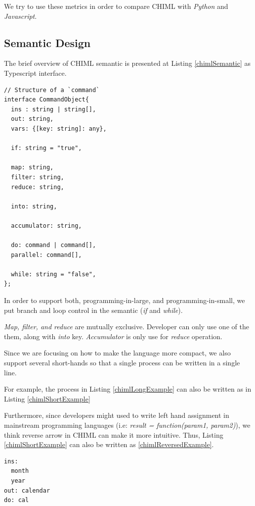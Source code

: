 \documentclass[conference]{IEEEtran}
\begin{document}
We try to use these metrics in order to compare CHIML with {\it Python} and {\it Javascript}.

\subsection{Semantic Design}

The brief overview of CHIML semantic is presented at Listing \ref{chimlSemantic} as Typescript interface.

\begin{lstlisting}[caption=CHIML Semantic Design, label=chimlSemantic, basicstyle=\footnotesize, breaklines=true]
// Structure of a `command`
interface CommandObject{
  ins : string | string[],
  out: string,
  vars: {[key: string]: any},

  if: string = "true",

  map: string,
  filter: string,
  reduce: string,

  into: string,

  accumulator: string,

  do: command | command[],
  parallel: command[],

  while: string = "false",
};
\end{lstlisting}

In order to support both, programming-in-large, and programming-in-small, we put branch and loop control in the semantic ({\it if} and {\it while}). 

{\it Map, filter, and reduce} are mutually exclusive. Developer can only use one of the them, along with {\it into} key. {\it Accumulator} is only use for {\it reduce} operation.

Since we are focusing on how to make the language more compact, we also support several short-hands so that a single process can be written in a single line.

For example, the process in Listing \ref{chimlLongExample} can also be written as in Listing \ref{chimlShortExample}

Furthermore, since developers might used to write left hand assignment in mainstream programming languages (i.e: {\it result = function(param1, param2)}), we think reverse arrow in CHIML can make it more intuitive. Thus, Listing \ref{chimlShortExample} can also be written as \ref{chimlReversedExample}.

\begin{lstlisting}[caption=CHIML Program Example, label=chimlLongExample, basicstyle=\footnotesize, breaklines=true]
ins:
  month
  year
out: calendar
do: cal
\end{lstlisting}
\end{document}
